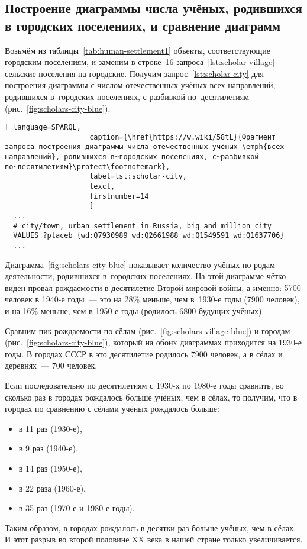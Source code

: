 \subsection{Построение диаграммы числа учёных, родившихся в городских поселениях, и сравнение диаграмм}

Возьмём из таблицы~\ref{tab:human-settlement1} объекты, соответствующие городским поселениям, 
и заменим в строке~16 запроса~\ref{lst:scholar-village} сельские поселения на городские. 
Получим запрос~\ref{lst:scholar-city} для построения диаграммы 
с числом отечественных учёных всех направлений, родившихся в~городских поселениях, 
с разбивкой по~десятилетиям (рис.~\ref{fig:scholars-city-blue}). 


\begin{lstlisting}[ language=SPARQL, 
                    caption={\href{https://w.wiki/58tL}{Фрагмент запроса построения диаграммы числа отечественных учёных \emph{всех направлений}, родившихся в~городских поселениях, с~разбивкой по~десятилетиям}\protect\footnotemark},
                    label=lst:scholar-city,
                    texcl, 
                    firstnumber=14
                    ]
  ...
  # city/town, urban settlement in Russia, big and million city
  VALUES ?placeb {wd:Q7930989 wd:Q2661988 wd:Q1549591 wd:Q1637706}
  ...
\end{lstlisting}%

Диаграмма~\ref{fig:scholars-city-blue} показывает количество учёных по родам деятельности, родившихся в~городских поселениях.
На этой диаграмме чётко виден провал рождаемости в десятилетие Второй мировой войны, 
а именно: 5700 человек в 1940-е годы~--- это на 28\% меньше, чем в~1930-е годы (7900 человек), 
и на 16\% меньше, чем в 1950-е годы (родилось 6800 будущих учёных). 

Сравним пик рождаемости по сёлам (рис.~\ref{fig:scholars-village-blue}) 
                       и городам (рис.~\ref{fig:scholars-city-blue}), 
который на обоих диаграммах приходится на 1930-е годы. 
В городах СССР в это десятилетие родилось 7900 человек, а в сёлах и деревнях~--- 700 человек. 

Если последовательно по десятилетиям с 1930-х по 1980-е годы 
сравнить, во сколько раз в городах рождалось больше учёных, чем в сёлах, 
то получим, что в городах по сравнению с сёлами учёных рождалось больше:
\begin{itemize}[noitemsep,topsep=0pt]
  \item в 11 раз (1930-е), 
  \item в 9 раз (1940-е), 
  \item в 14 раз (1950-е), 
  \item в 22 раза (1960-е), 
  \item в 35 раз (1970-е и 1980-е годы).
\end{itemize}

Таким образом, в городах рождалось в десятки раз больше учёных, чем в сёлах. 
И этот разрыв во второй половине XX века в нашей стране только увеличивается. 
